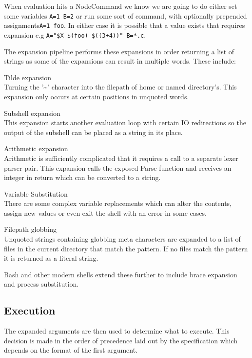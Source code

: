 When evaluation hits a NodeCommand we know we are going to do either set some variables \verb!A=1 B=2! or run some sort of command, with optionally prepended assignments\verb!A=1 foo!.
In either case it is possible that a value exists that requires expansion e.g \verb!A="$X $(foo) $((3+4))" B=*.c!.

The expansion pipeline performs these expansions in order returning a list of strings as some of the expansions can result in multiple words.
These include:
\begin{description*}
	\item Tilde expansion \hfill \\
    	Turning the '\textasciitilde' character into the filepath of home or named directory's.
    	This expansion only occurs at certain positions in unquoted words.
    \item Subshell expansion \hfill \\
    	This expansion starts another evaluation loop with certain IO redirections so the output of the subshell can be placed as a string in its place.
	\item Arithmetic expansion \hfill \\
    	Arithmetic is sufficiently complicated that it requires a call to a separate lexer parser pair.
        This expansion calls the exposed Parse function and receives an integer in return which can be converted to a string.
    \item Variable Substitution \hfill \\
    	There are some complex variable replacements which can alter the contents, assign new values or even exit the shell with an error in some cases.
	\item Filepath globbing \hfill \\
    	Unquoted strings containing globbing meta characters are expanded to a list of files in the current directory that match the pattern.
        If no files match the pattern it is returned as a literal string.
\end{description*}

Bash and other modern shells extend these further to include brace expansion and process substitution.

\subsection{Execution}

The expanded arguments are then used to determine what to execute.
This decision is made in the order of precedence laid out by the specification which depends on the format of the first argument.

